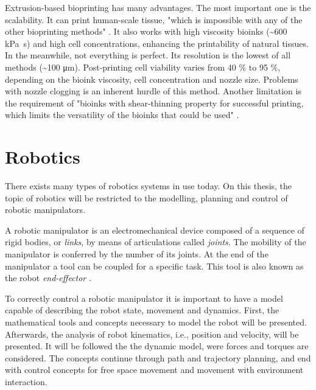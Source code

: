Extrusion-based bioprinting has many advantages. The most important one is the scalability. It can print human-scale tissue, "which is impossible with any of the other bioprinting methods" \cite{Vijayavenkataraman2018_bioprinting_tissues_organs_regen_med}. It also works with high viscosity bioinks (\textasciitilde 600 \si{\kilo\pascal\second}) and high cell concentrations, enhancing the printability of natural tissues. In the meanwhile, not everything is perfect. Its resolution is the lowest of all methods (\textasciitilde 100 \si{\micro\meter}). Post-printing cell viability varies from 40 \% to 95 \%, depending on the bioink viscosity, cell concentration and nozzle size. Problems with nozzle clogging is an inherent hurdle of this method. Another limitation is the requirement of "bioinks with shear-thinning property for successful printing, which limits the versatility of the bioinks that could be used" \cite{Vijayavenkataraman2018_bioprinting_tissues_organs_regen_med}.





\section{Robotics}
\label{sec:robotics}

There exists many types of robotics systems in use today. On this thesis, the topic of robotics will be restricted to the modelling, planning and control of robotic manipulators.

A robotic manipulator is an electromechanical device composed of a sequence of rigid bodies, or \emph{links}, by means of articulations called \emph{joints}. The mobility of the manipulator is conferred by the number of its joints. At the end of the manipulator a tool can be coupled for a specific task. This tool is also known as the robot \emph{end-effector} \cite{Siciliano2009_robotics_modelling_planning_control}.

To correctly control a robotic manipulator it is important to have a model capable of describing the robot state, movement and dynamics. First, the mathematical tools and concepts necessary to model the robot will be presented. Afterwards, the analysis of robot kinematics, i.e., position and velocity, will be presented. It will be followed the the dynamic model, were forces and torques are considered. The concepts continue through path and trajectory planning, and end with control concepts for free space movement and movement with environment interaction.

